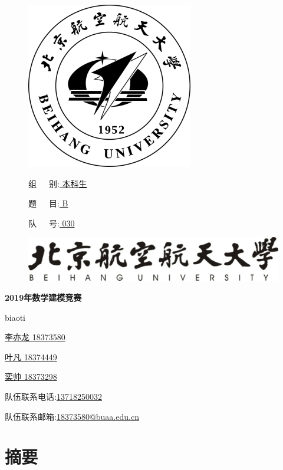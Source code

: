 \documentclass[zihao=-4]{ctexart}
\begin{document}
\begin{figure}
    \begin{minipage}{0.6\linewidth}
        \includegraphics{pic/xiaohui.png}
    \end{minipage}
    \hfill
    \begin{minipage}{0.3\linewidth}
        组\ \ \ 别:\underline{ 本科生 }
        
        题\ \ \ 目:\underline{ B }

        队\ \ \ 号:\underline{ 030 }
    \end{minipage}
\end{figure}

\vbox{}
\vbox{}

\begin{figure}[H]
    \centering
    \includegraphics{pic/xiaoming.png}
\end{figure}
\vbox{}
\centerline{\textbf{\Huge{2019年数学建模竞赛}}}
\vbox{}
\vbox{}
\centerline{\LARGE{biaoti}}
\vbox{}
\vbox{}
\vbox{}


\centerline{\underline{李亦龙 18373580}}\par
\centerline{\underline{叶凡 18374449}}\par
\centerline{\underline{栾帅 18373298}}\par
\centerline{队伍联系电话:\underline{13718250032}}\par
\centerline{队伍联系邮箱:\underline{18373580@buaa.edu.cn}}\par

\normalsize

\newpage
\section*{摘要}
\end{document}
